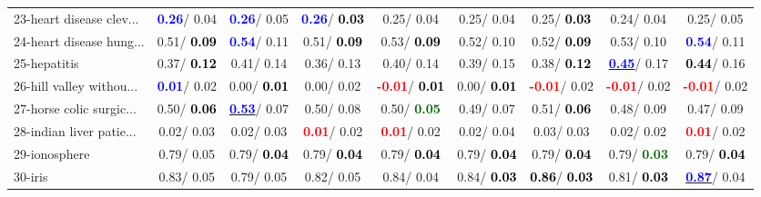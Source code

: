 \begin{table}[h]
\begin{center}
\begin{tabular}{lc|c|c|c|c|c|c|c}
23-heart disease clev... & \textcolor{blue}{\textbf{  0.26}}/  0.04 & \textcolor{blue}{\textbf{  0.26}}/  0.05 & \textcolor{blue}{\textbf{  0.26}}/\textcolor{black}{\textbf{  0.03}} &   0.25/  0.04 &   0.25/  0.04 &   0.25/\textcolor{black}{\textbf{  0.03}} &   0.24/  0.04 &   0.25/  0.05 \\
24-heart disease hung... &   0.51/\textcolor{black}{\textbf{  0.09}} & \textcolor{blue}{\textbf{  0.54}}/  0.11 &   0.51/\textcolor{black}{\textbf{  0.09}} &   0.53/\textcolor{black}{\textbf{  0.09}} &   0.52/  0.10 &   0.52/\textcolor{black}{\textbf{  0.09}} &   0.53/  0.10 & \textcolor{blue}{\textbf{  0.54}}/  0.11 \\
25-hepatitis &   0.37/\textcolor{black}{\textbf{  0.12}} &   0.41/  0.14 &   0.36/  0.13 &   0.40/  0.14 &   0.39/  0.15 &   0.38/\textcolor{black}{\textbf{  0.12}} & \underline{\textcolor{blue}{\textbf{  0.45}}}/  0.17 & \textcolor{black}{\textbf{  0.44}}/  0.16 \\
26-hill valley withou... & \textcolor{blue}{\textbf{  0.01}}/  0.02 &   0.00/\textcolor{black}{\textbf{  0.01}} &   0.00/  0.02 & \textcolor{red}{\textbf{ -0.01}}/\textcolor{black}{\textbf{  0.01}} &   0.00/\textcolor{black}{\textbf{  0.01}} & \textcolor{red}{\textbf{ -0.01}}/  0.02 & \textcolor{red}{\textbf{ -0.01}}/  0.02 & \textcolor{red}{\textbf{ -0.01}}/  0.02 \\
27-horse colic surgic... &   0.50/\textcolor{black}{\textbf{  0.06}} & \underline{\textcolor{blue}{\textbf{  0.53}}}/  0.07 &   0.50/  0.08 &   0.50/\textcolor{darkgreen}{\textbf{  0.05}} &   0.49/  0.07 &   0.51/\textcolor{black}{\textbf{  0.06}} &   0.48/  0.09 &   0.47/  0.09 \\
28-indian liver patie... &   0.02/  0.03 &   0.02/  0.03 & \textcolor{red}{\textbf{  0.01}}/  0.02 & \textcolor{red}{\textbf{  0.01}}/  0.02 &   0.02/  0.04 &   0.03/  0.03 &   0.02/  0.02 & \textcolor{red}{\textbf{  0.01}}/  0.02 \\ \hline
29-ionosphere &   0.79/  0.05 &   0.79/\textcolor{black}{\textbf{  0.04}} &   0.79/\textcolor{black}{\textbf{  0.04}} &   0.79/\textcolor{black}{\textbf{  0.04}} &   0.79/\textcolor{black}{\textbf{  0.04}} &   0.79/\textcolor{black}{\textbf{  0.04}} &   0.79/\textcolor{darkgreen}{\textbf{  0.03}} &   0.79/\textcolor{black}{\textbf{  0.04}} \\
30-iris &   0.83/  0.05 &   0.79/  0.05 &   0.82/  0.05 &   0.84/  0.04 &   0.84/\textcolor{black}{\textbf{  0.03}} & \textcolor{black}{\textbf{  0.86}}/\textcolor{black}{\textbf{  0.03}} &   0.81/\textcolor{black}{\textbf{  0.03}} & \underline{\textcolor{blue}{\textbf{  0.87}}}/  0.04 \\

\end{tabular}
\end{center}
\end{table}
